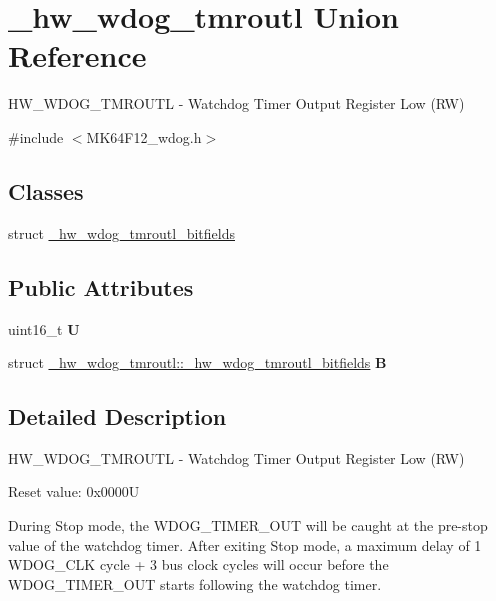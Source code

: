 \hypertarget{union__hw__wdog__tmroutl}{}\section{\+\_\+hw\+\_\+wdog\+\_\+tmroutl Union Reference}
\label{union__hw__wdog__tmroutl}


H\+W\+\_\+\+W\+D\+O\+G\+\_\+\+T\+M\+R\+O\+U\+TL -\/ Watchdog Timer Output Register Low (RW)  




{\ttfamily \#include $<$M\+K64\+F12\+\_\+wdog.\+h$>$}

\subsection*{Classes}
\begin{DoxyCompactItemize}
\item 
struct \hyperlink{struct__hw__wdog__tmroutl_1_1__hw__wdog__tmroutl__bitfields}{\+\_\+hw\+\_\+wdog\+\_\+tmroutl\+\_\+bitfields}
\end{DoxyCompactItemize}
\subsection*{Public Attributes}
\begin{DoxyCompactItemize}
\item 
uint16\+\_\+t {\bfseries U}\hypertarget{union__hw__wdog__tmroutl_abd30eb8b2681e6af14327d03464d75ff}{}\label{union__hw__wdog__tmroutl_abd30eb8b2681e6af14327d03464d75ff}

\item 
struct \hyperlink{struct__hw__wdog__tmroutl_1_1__hw__wdog__tmroutl__bitfields}{\+\_\+hw\+\_\+wdog\+\_\+tmroutl\+::\+\_\+hw\+\_\+wdog\+\_\+tmroutl\+\_\+bitfields} {\bfseries B}\hypertarget{union__hw__wdog__tmroutl_a987cbaca9cf0508474e9e42f2d80b883}{}\label{union__hw__wdog__tmroutl_a987cbaca9cf0508474e9e42f2d80b883}

\end{DoxyCompactItemize}


\subsection{Detailed Description}
H\+W\+\_\+\+W\+D\+O\+G\+\_\+\+T\+M\+R\+O\+U\+TL -\/ Watchdog Timer Output Register Low (RW) 

Reset value\+: 0x0000U

During Stop mode, the W\+D\+O\+G\+\_\+\+T\+I\+M\+E\+R\+\_\+\+O\+UT will be caught at the pre-\/stop value of the watchdog timer. After exiting Stop mode, a maximum delay of 1 W\+D\+O\+G\+\_\+\+C\+LK cycle + 3 bus clock cycles will occur before the W\+D\+O\+G\+\_\+\+T\+I\+M\+E\+R\+\_\+\+O\+UT starts following the watchdog timer. 

